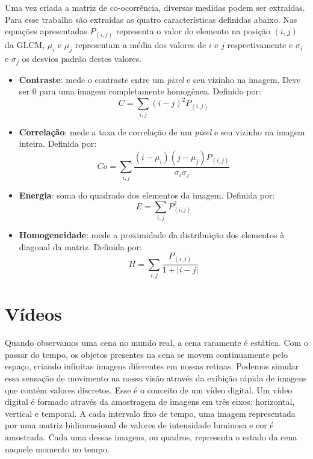 Uma vez criada a matriz de co-ocorrência, diversas medidas podem ser extraídas. Para esse trabalho são extraídas as quatro características definidas abaixo. Nas equações apresentadas $P_{(i,j)}$ representa o valor do elemento na posição $(i,j)$ da GLCM, $\mu_i$ e $\mu_j$ representam a média dos valores de $i$ e $j$ respectivamente e $\sigma_i$ e $\sigma_j$ os desvios padrão destes valores.

\begin{itemize}

\item \textbf{Contraste}: mede o contraste entre um \textit{pixel} e seu vizinho na imagem. Deve ser 0 para uma imagem completamente homogênea. Definido por:
	\begin{equation}
		C = \sum_{i,j} (i-j)^{2}P_{(i,j)}
	\label{eq:Contraste}
	\end{equation}
	
\item \textbf{Correlação}: mede a taxa de correlação de um \textit{pixel} e seu vizinho na imagem inteira. Definida por:
	\begin{equation}
		Co = \sum_{i,j} \frac{(i - \mu_i)(j - \mu_j)P_{(i,j)}}{\sigma_i\sigma_j}
	\label{eq:Correlacao}
	\end{equation}
	
\item \textbf{Energia}: soma do quadrado dos elementos da imagem. Definida por:
	\begin{equation}
		E = \sum_{i,j} P_{(i,j)}^{2}
		\label{eq:Energia}
	\end{equation}
	
\item \textbf{Homogeneidade}: mede a proximidade da distribuição dos elementos à diagonal da matriz. Definida por:
	\begin{equation}
		H = \sum_{i,j} \frac{P_{(i,j)}}{1+|i-j|}
		\label{eq:Homo}
	\end{equation}

\end{itemize}


\section{Vídeos}\label{sec:video}


Quando observamos uma cena no mundo real, a cena raramente é estática. Com o passar do tempo, os objetos presentes na cena se movem continuamente pelo espaço, criando infinitas imagens diferentes em nossas retinas. Podemos simular essa sensação de movimento na nossa visão através da exibição rápida de imagens que contém valores discretos. Esse é o conceito de um vídeo digital. Um vídeo digital é formado através da amostragem de imagens	em três eixos: horizontal, vertical e temporal\cite{LivroVideoDigital}. A cada intervalo fixo de tempo, uma imagem representada por uma matriz bidimensional de valores de intensidade luminosa e cor é amostrada. Cada uma dessas imagens, ou quadros, representa o estado da cena naquele momento no tempo.

